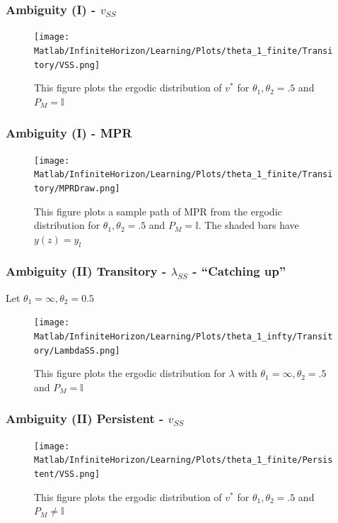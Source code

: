 \documentclass{beamer}
\theoremstyle{definition}
\begin{document}
\begin{frame}
\frametitle{Ambiguity (I) - $v_{SS}$}
\begin{figure}[htbp]
\centering
	  \texttt{[image: Matlab/InfiniteHorizon/Learning/Plots/theta\_1\_finite/Transitory/VSS.png]}

	\caption{\small {This figure plots the ergodic distribution of $v^*$ for $\theta_1,\theta_2 =.5$ and $P_M=\mathbb{I}$}}
	
	\label{fig:VSS_theta_1_finite_transitory}
\end{figure} 
\end{frame}
%
%
%
\begin{frame}
\frametitle{Ambiguity (I) - MPR }
\begin{figure}[htbp]
\centering
	  \texttt{[image: Matlab/InfiniteHorizon/Learning/Plots/theta\_1\_finite/Transitory/MPRDraw.png]}

	\caption{\small {This figure plots a sample path of MPR from the ergodic distribution for $\theta_1,\theta_2 =.5$ and $P_M=\mathbb{I}$}. The shaded bars have $y(z)=y_l$}

	\label{fig:MPRDraw_theta_1_finite_transitory}
\end{figure} 
\end{frame}

%
%
\begin{frame}
\frametitle{Ambiguity (II) Transitory - $\lambda_{SS}$ - ``Catching up''}
Let $\theta_1=\infty,\theta_2 =0.5$
\begin{figure}[htbp]
\centering
	  \texttt{[image: Matlab/InfiniteHorizon/Learning/Plots/theta\_1\_infty/Transitory/LambdaSS.png]}

	\caption{\small {This figure plots the ergodic distribution for $\lambda$ with $\theta_1=\infty,\theta_2 =.5$ and $P_M=\mathbb{I}$}}
	
	\label{fig:LambdaSS_theta_1_infty_transitory}
\end{figure} 
\end{frame}
%
\begin{frame}
\frametitle{Ambiguity (II) Persistent - $v_{SS}$}
\begin{figure}[htbp]
\centering
	  \texttt{[image: Matlab/InfiniteHorizon/Learning/Plots/theta\_1\_finite/Persistent/VSS.png]}
%
	\caption{\small {This figure plots the ergodic distribution of $v^*$ for $\theta_1,\theta_2 =.5$ and $P_M \neq \mathbb{I}$}}
%	
	\label{fig:VSS_theta_1_finite_persistent}
	\end{figure}
\end{frame}
\end{document}
